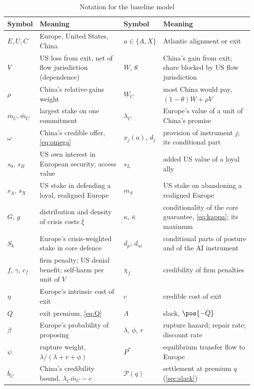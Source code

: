 \begin{table}[t]
\centering
\small
\caption{Notation for the baseline model}\label{tab:notation}
\begin{tabularx}{\textwidth}{@{}l>{\raggedright\arraybackslash}Xl>{\raggedright\arraybackslash}X@{}}
\toprule
Symbol & Meaning & Symbol & Meaning\\
\midrule
$E,U,C$ & Europe, United States, China & $a\in\{A,X\}$ & Atlantic alignment or exit\\
$V$ & US loss from exit, net of flow jurisdiction (dependence) & $W$, $\theta$ & China's gain from exit; share blocked by US flow jurisdiction\\
$\rho$ & China's relative-gains weight & $W_C$ & most China would pay, $(1-\theta)W+\rho V$\\
$\bar m_U,\bar m_C$ & largest stake on one commitment & $\lambda_C$ & Europe's value of a unit of China's promise\\
$\omega$ & China's credible offer, \cref{eq:omega} & $x_j(a)$, $d_j$ & provision of instrument $j$; its conditional part\\
$s_0$, $s_B$ & US own interest in European security; access value & $s_L$ & added US value of a loyal ally\\
$s_A$, $s_X$ & US stake in defending a loyal, realigned Europe & $m_S$ & US stake on abandoning a realigned Europe\\
$G$, $g$ & distribution and density of crisis costs $\xi$ & $\kappa$, $\bar\kappa$ & conditionality of the core guarantee, \cref{eq:kappa}; its maximum\\
$S_k$ & Europe's crisis-weighted stake in core defence & $d_p$, $d_{ai}$ & conditional parts of posture and of the AI instrument\\
$f$, $\gamma$, $c_f$ & firm penalty; US denial benefit; self-harm per unit of $V$ & $\chi_f$ & credibility of firm penalties\\
$\eta$ & Europe's intrinsic cost of exit & $c$ & credible cost of exit\\
$Q$ & exit premium, \cref{eq:Q} & $\Lambda$ & slack, $\pos{-Q}$\\
$\beta$ & Europe's probability of proposing & $\lambda$, $\phi$, $r$ & rupture hazard; repair rate; discount rate\\
$\psi$ & rupture weight, $\lambda/(\lambda+r+\phi)$ & $P^*$ & equilibrium transfer flow to Europe\\
$\bar b_C$ & China's credibility bound, $\lambda_C\bar m_C-c$ & $\mathcal P(q)$ & settlement at premium $q$ (\cref{sec:slack})\\
\bottomrule
\end{tabularx}
\end{table}

